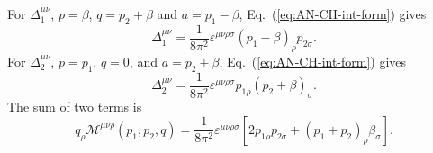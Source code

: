 \documentclass[aps,prb,superscriptaddress,nofootinbib]{revtex4}
\begin{document}
For $\Delta_{1}^{\mu\nu}$, $p=\beta$, $q=p_2+\beta$ and $a=p_1-\beta$, Eq.~(\ref{eq:AN-CH-int-form}) gives
\begin{equation}
	\Delta^{\mu\nu}_1 = \frac{1}{8\pi^2} \varepsilon^{\mu\nu\rho\sigma} (p_1-\beta)_\rho p_{2\sigma}.
\end{equation}
For $\Delta_2^{\mu\nu}$, $p=p_1$, $q=0$, and $a=p_2+\beta$, Eq.~(\ref{eq:AN-CH-int-form}) gives
\begin{equation}
	\Delta^{\mu\nu}_2 = \frac{1}{8\pi^2} \varepsilon^{\mu\nu\rho\sigma} p_{1\rho}(p_2+\beta)_\sigma.
\end{equation}
The sum of two terms is
\begin{equation}
	q_\rho \mathcal{M}^{\mu\nu\rho}(p_1,p_2,q) = \frac{1}{8\pi^2} \varepsilon^{\mu\nu\rho\sigma} \left[2 p_{1\rho} p_{2\sigma} + (p_1+p_2)_\rho \beta_\sigma \right].
\end{equation}
\end{document}
